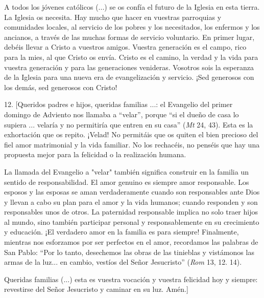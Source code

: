 A todos los jóvenes católicos (...) se os confía el futuro de la Iglesia
en esta tierra. La Iglesia os necesita. Hay mucho que hacer en vuestras
parroquias y comunidades locales, al servicio de los pobres y los
necesitados, los enfermos y los ancianos, a través de las muchas formas
de servicio voluntario. En primer lugar, debéis llevar a Cristo a
vuestros amigos. Vuestra generación es el campo, rico para la mies, al
que Cristo os envía. Cristo es el camino, la verdad y la vida para
vuestra generación y para las generaciones venideras. Vosotros sois la
esperanza de la Iglesia para una nueva era de evangelización y servicio.
¡Sed generosos con los demás, sed generosos con Cristo!

12. {[}Queridos padres e hijos, queridas familias ...: el Evangelio del
primer domingo de Adviento nos llamaba a ``velar'', porque ``si el dueño
de casa lo supiera ... velaría y no permitiría que entren en su casa''
(\emph{Mt} 24, 43). Esta es la exhortación que os repito. ¡Velad! No
permitáis que os quiten el bien precioso del fiel amor matrimonial y la
vida familiar. No los rechacéis, no penséis que hay una propuesta mejor
para la felicidad o la realización humana.

La llamada del Evangelio a "velar" también significa construir en la
familia un sentido de responsabilidad. El amor genuino es siempre amor
responsable. Los esposos y las esposas se aman verdaderamente cuando son
responsables ante Dios y llevan a cabo su plan para el amor y la vida
humanos; cuando responden y son responsables unos de otros. La
paternidad responsable implica no solo traer hijos al mundo, sino
también participar personal y responsablemente en su crecimiento y
educación. ¡El verdadero amor en la familia es para siempre! Finalmente,
mientras nos esforzamos por ser perfectos en el amor, recordamos las
palabras de San Pablo: ``Por lo tanto, desechemos las obras de las
tinieblas y vistámonos las armas de la luz... en cambio, vestíos del
Señor Jesucristo'' (\emph{Rom} 13, 12. 14).

Queridas familias (...) esta es vuestra vocación y vuestra felicidad hoy
y siempre: revestirse del Señor Jesucristo y caminar en su luz. Amén.{]}
